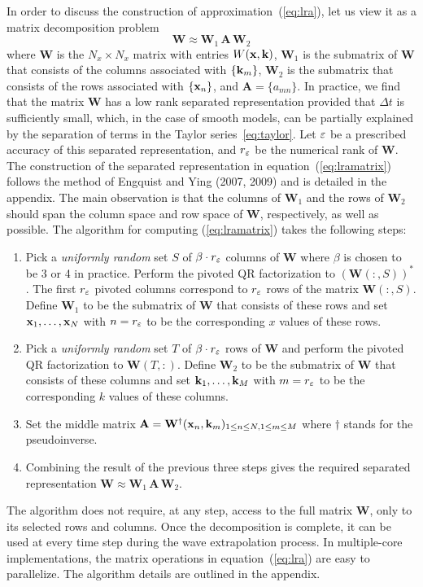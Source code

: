 In order to discuss the construction of approximation~(\ref{eq:lra}),
let us view it as a matrix decomposition problem
\begin{equation}
  \label{eq:lramatrix}
  \mathbf{W} \approx \mathbf{W}_1 \, \mathbf{A} \, \mathbf{W}_2
\end{equation} 
where $\mathbf{W}$ is the $N_x\times N_x$ matrix with entries
$W(\mathbf{x},\mathbf{k})$, $\mathbf{W}_1$ is the submatrix of $\mathbf{W}$ that
consists of the columns associated with $\{\mathbf{k}_m\}$, $\mathbf{W}_2$ is
the submatrix that consists of the rows associated with $\{\mathbf{x}_n\}$,
and $\mathbf{A} = \{a_{mn}\}$. In practice, we find that the
matrix $\mathbf{W}$ has a low rank separated representation provided
that $\Delta t$ is sufficiently small, which, in the case of
smooth models, can be partially explained by the separation of terms
in the Taylor series~\ref{eq:taylor}. Let $\varepsilon$ be a prescribed
accuracy of this separated representation, and $r_\varepsilon$ be the
numerical rank of $\mathbf{W}$. The construction of the separated
representation in equation~(\ref{eq:lramatrix}) follows the method of
Engquist and Ying (2007, 2009) and is detailed in the appendix. The
main observation is that the columns of $\mathbf{W}_1$ and the rows of
$\mathbf{W}_2$ should span the column space and row space of
$\mathbf{W}$, respectively, as well as possible. The algorithm for
computing (\ref{eq:lramatrix}) takes the following steps:
\begin{enumerate}
\item Pick a {\em uniformly random} set $S$ of $\beta \cdot r_\varepsilon$
  columns of $\mathbf{W}$ where $\beta$ is chosen to be 3 or 4 in
  practice. Perform the pivoted QR factorization to
  $(\mathbf{W}(:,S))^*$ \cite[]{golub}. The first $r_\varepsilon$ pivoted
  columns correspond to $r_\varepsilon$ rows of the matrix
  $\mathbf{W}(:,S)$. Define $\mathbf{W}_1$ to be the submatrix of
  $\mathbf{W}$ that consists of these rows and set $\mathbf{x}_1,\ldots,\mathbf{x}_N$
  with $n=r_\varepsilon$ to be the corresponding $x$ values of these rows.
\item Pick a {\em uniformly random} set $T$ of $\beta \cdot r_\varepsilon$
  rows of $\mathbf{W}$ and perform the pivoted QR factorization to
  $\mathbf{W}(T,:)$. Define $\mathbf{W}_2$ to be the submatrix of $\mathbf{W}$ that consists of
  these columns and set $\mathbf{k}_1,\ldots,\mathbf{k}_M$ with $m=r_\varepsilon$ to be the
  corresponding $k$ values of these columns.
\item Set the middle matrix $\mathbf{A} = \mathbf{W}^{\dagger}(\mathbf{x}_n,\mathbf{k}_m)_{1\le n \le N, 1\le
      m \le M}$ where $\dagger$ stands for the pseudoinverse.
\item Combining the result of the previous three steps gives the
  required separated representation $\mathbf{W} \approx \mathbf{W}_1 \, \mathbf{A} \, \mathbf{W}_2$.
\end{enumerate}
The algorithm does not require, at any step, access to the full matrix
$\mathbf{W}$, only to its selected rows and columns. Once the
decomposition is complete, it can be used at every time step during
the wave extrapolation process. In multiple-core implementations, the
matrix operations in equation~(\ref{eq:lra}) are easy to
parallelize. The algorithm details are outlined in the appendix.

